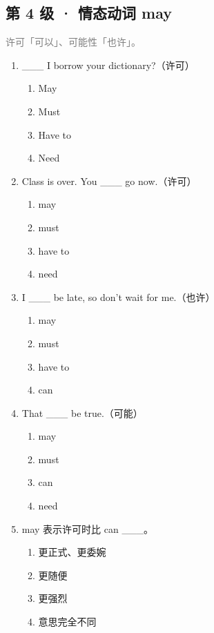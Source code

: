 \documentclass[11pt,a4paper]{ctexart}
\begin{document}
\subsection*{第 4 级 · 情态动词 may}
\noindent\textcolor{gray}{许可「可以」、可能性「也许」。}\par\smallskip
\begin{enumerate}[leftmargin=*,itemsep=4pt]
\item \_\_\_ I borrow your dictionary?（许可）
\begin{enumerate}[label=\Alph*.,leftmargin=2em,itemsep=1pt,topsep=2pt]
\item May
\item Must
\item Have to
\item Need
\end{enumerate}
\item Class is over. You \_\_\_ go now.（许可）
\begin{enumerate}[label=\Alph*.,leftmargin=2em,itemsep=1pt,topsep=2pt]
\item may
\item must
\item have to
\item need
\end{enumerate}
\item I \_\_\_ be late, so don’t wait for me.（也许）
\begin{enumerate}[label=\Alph*.,leftmargin=2em,itemsep=1pt,topsep=2pt]
\item may
\item must
\item have to
\item can
\end{enumerate}
\item That \_\_\_ be true.（可能）
\begin{enumerate}[label=\Alph*.,leftmargin=2em,itemsep=1pt,topsep=2pt]
\item may
\item must
\item can
\item need
\end{enumerate}
\item may 表示许可时比 can \_\_\_。
\begin{enumerate}[label=\Alph*.,leftmargin=2em,itemsep=1pt,topsep=2pt]
\item 更正式、更委婉
\item 更随便
\item 更强烈
\item 意思完全不同

\end{enumerate}
\end{enumerate}
\end{document}
